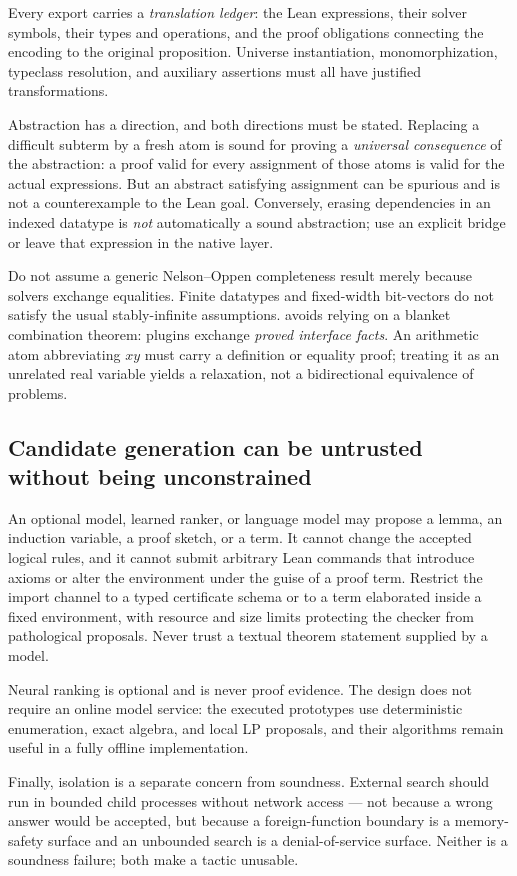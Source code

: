 Every export carries a \emph{translation ledger}: the Lean expressions, their
solver symbols, their types and operations, and the proof obligations connecting
the encoding to the original proposition. Universe instantiation,
monomorphization, typeclass resolution, and auxiliary assertions must all have
justified transformations.

Abstraction has a direction, and both directions must be stated. Replacing a
difficult subterm by a fresh atom is sound for proving a \emph{universal
consequence} of the abstraction: a proof valid for every assignment of those
atoms is valid for the actual expressions. But an abstract satisfying assignment
can be spurious and is not a counterexample to the Lean goal. Conversely,
erasing dependencies in an indexed datatype is \emph{not} automatically a sound
abstraction; use an explicit bridge or leave that expression in the native
layer.

\begin{remark}
Do not assume a generic Nelson--Oppen completeness result merely because solvers
exchange equalities. Finite datatypes and fixed-width bit-vectors do not satisfy
the usual stably-infinite assumptions. \forge{} avoids relying on a blanket
combination theorem: plugins exchange \emph{proved interface facts}. An
arithmetic atom abbreviating $xy$ must carry a definition or equality proof;
treating it as an unrelated real variable yields a relaxation, not a
bidirectional equivalence of problems.
\end{remark}

\subsection{Candidate generation can be untrusted without being unconstrained}

An optional model, learned ranker, or language model may propose a lemma, an
induction variable, a proof sketch, or a term. It cannot change the accepted
logical rules, and it cannot submit arbitrary Lean commands that introduce
axioms or alter the environment under the guise of a proof term. Restrict the
import channel to a typed certificate schema or to a term elaborated inside a
fixed environment, with resource and size limits protecting the checker from
pathological proposals. Never trust a textual theorem statement supplied by a
model.

Neural ranking is optional and is never proof evidence. The design does not
require an online model service: the executed prototypes use deterministic
enumeration, exact algebra, and local LP proposals, and their algorithms remain
useful in a fully offline implementation.

Finally, isolation is a separate concern from soundness. External search should
run in bounded child processes without network access --- not because a wrong
answer would be accepted, but because a foreign-function boundary is a
memory-safety surface and an unbounded search is a denial-of-service surface.
Neither is a soundness failure; both make a tactic unusable.

